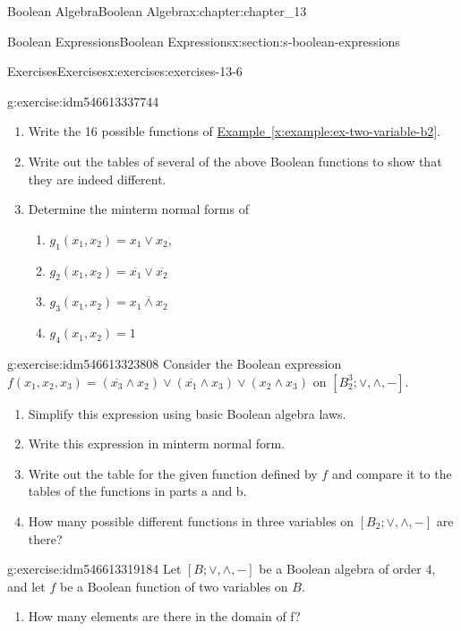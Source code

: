 \documentclass[oneside,10pt,]{book}
\newcommand{\xreffont}{\relax}
\numberwithin{equation}{section}
\begin{document}
\begin{chapterptx}{Boolean Algebra}{}{Boolean Algebra}{}{}{x:chapter:chapter_13}
\begin{sectionptx}{Boolean Expressions}{}{Boolean Expressions}{}{}{x:section:s-boolean-expressions}
\begin{exercises-subsection}{Exercises}{}{Exercises}{}{}{x:exercises:exercises-13-6}
\begin{divisionexercise}{1}{}{}{g:exercise:idm546613337744}%
%
\begin{enumerate}[label=(\alph*)]
\item{}Write the 16 possible functions of \hyperref[x:example:ex-two-variable-b2]{Example~{\xreffont\ref{x:example:ex-two-variable-b2}}}.%
\item{}Write out the tables of several of the above Boolean functions to show that they are indeed different.%
\item{}Determine the minterm normal forms of%
\begin{enumerate}[label=(\roman*)]
\item{}\(g_1\left(x_1, x_2\right)=x_1\lor x_2,\)%
\item{}\(g_2\left(x_1, x_2\right)=\overline{x_1}\lor \overline{x_2}\)%
\item{}\(g_3\left(x_1, x_2\right)=\overline{x_1 \land x_2}\)%
\item{}\(g_4\left(x_1, x_2\right)=1\)%
\end{enumerate}
%
\end{enumerate}
%
\end{divisionexercise}%
\begin{divisionexercise}{2}{}{}{g:exercise:idm546613323808}%
Consider the Boolean expression \(f\left(x_1, x_2, x_3\right)=\left(\overline{x_3}\land x_2\right)\lor\left(\overline{x_1}\land x_3\right)\lor
\left(x_2\land x_3\right)\) on \(\left[B_2^3; \lor, \land, - \right].\)%
\begin{enumerate}[label=(\alph*)]
\item{}Simplify this expression using basic Boolean algebra laws.%
\item{}Write this expression in minterm normal form.%
\item{}Write out the table for the given function defined by \(f\) and compare it to the tables of the functions in parts a and b.%
\item{}How many possible different functions in three variables on \(\left[B_2; \lor, \land, - \right]\) are there?%
\end{enumerate}
%
\end{divisionexercise}%
\begin{divisionexercise}{3}{}{}{g:exercise:idm546613319184}%
Let \([B; \lor , \land, - ]\) be a Boolean algebra of order 4, and let \(f\) be a Boolean function of two variables on \(B\).%
\begin{enumerate}[label=(\alph*)]
\item{}How many elements are there in the domain of f?%

\end{enumerate}
\end{divisionexercise}
\end{exercises-subsection}
\end{sectionptx}
\end{chapterptx}
\end{document}

